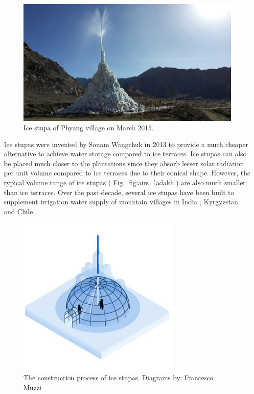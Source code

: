 \begin{figure}[htb]
\centering
\includegraphics[width=\textwidth]{figs/IS_example.jpg}
\caption{Ice stupa of Phyang village on March 2015.}
\label{fig:ISexample}
\end{figure}

Ice stupas were invented by Sonam Wangchuk in 2013 \cite{wangchukIceStupaArtificial2014} to provide a much
cheaper alternative to achieve water storage compared to ice terraces. Ice stupas can also be placed much closer
to the plantations since they absorb lesser solar radiation per unit volume compared to ice terraces due to
their conical shape. However, the typical volume range of ice stupas ( Fig. \ref{fig:airs_ladakh}) are also
much smaller than ice terraces. Over the past decade, several ice stupas have been built to supplement
irrigation water supply of mountain villages in India \citep{wangchukIceStupaCompetition2020,
palmerStoringFrozenWater2022, aggarwalAdaptationClimateChange2021}, Kyrgyzstan
\citep{bbcnewsBrightArtificialGlacier2020} and Chile \citep{reutersConservationistsChileAim2021}.


\begin{figure}[htb]
\centering
\includegraphics[width=8cm]{figs/IS_science.jpg}
\caption{The construction process of ice stupas. Diagrams by: Francesco Muzzi }
\label{fig:ISconstruction}
\end{figure}

